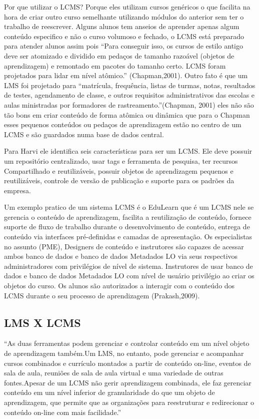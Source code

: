 \documentclass[12pt]{article}
\begin{document}
Por que utilizar o LCMS? Porque eles utilizam cursos genéricos o que facilita na hora de criar outro curso semelhante utilizando módulos do 
anterior sem ter o trabalho de reescrever. Alguns alunos tem anseios de aprender apenas algum conteúdo especifico e não o curso volumoso e fechado, 
o LCMS está preparado para atender alunos assim pois “Para conseguir isso, os cursos de estilo antigo deve ser atomizado e dividido em pedaços de 
tamanho razoável (objetos de aprendizagem) e remontado em pacotes do tamanho certo. LCMS foram projetados para lidar em nível atômico.” (Chapman,2001). Outro fato é que um LMS foi projetado para “matrícula, frequência, listas de turmas, notas, resultados de testes, agendamento de classe, e outros requisitos administrativos das escolas e aulas ministradas por formadores de rastreamento.”(Chapman, 2001) eles não são tão bons em criar conteúdo de forma atômica ou dinâmica que para o Chapman esses pequenos conteúdos ou pedaços de aprendizagem estão no centro de um LCMS e são guardados numa base de dados central.

Para Harvi ele identifica seis características para ser um LCMS. Ele deve possuir um repositório centralizado, usar tags e ferramenta de pesquisa, 
ter recursos Compartilhado e reutilizáveis, possuir objetos de aprendizagem pequenos e reutilizáveis, controle de versão de publicação e suporte 
para os padrões da empresa.


Um exemplo pratico de um sistema LCMS é o EduLearn que é um LCMS nele se gerencia o conteúdo de aprendizagem, facilita a reutilização de conteúdo, 
fornece suporte de fluxo de trabalho durante o desenvolvimento de conteúdo, entrega de conteúdo via interfaces pré-definidas e camadas de 
apresentação. Os especialistas no assunto (PME), Designers de conteúdo e instrutores são capazes de acessar ambos banco de dados e banco de dados 
Metadados LO via seus respectivos administradores com privilégios de nível de sistema. Instrutores de usar banco de dados e banco de dados 
Metadados LO com nível de usuário privilégio ao criar os objetos do curso. Os alunos são autorizados a interagir com o conteúdo dos LCMS durante o 
seu processo de aprendizagem (Prakash,2009).

\subsection{LMS X LCMS}

“As duas ferramentas podem gerenciar e controlar conteúdo em um nível objeto de aprendizagem também.Um LMS, no entanto, pode gerenciar e 
acompanhar cursos combinados e currículo montados a partir de conteúdo on-line, eventos de sala de aula, reuniões de sala de aula virtual e uma 
variedade de outras fontes.Apesar de um LCMS não gerir aprendizagem combinada, ele faz gerenciar conteúdo em um nível inferior de granularidade do 
que um objeto de aprendizagem, que permite que as organizações para reestruturar e redirecionar o conteúdo on-line com mais facilidade.”
\end{document}
